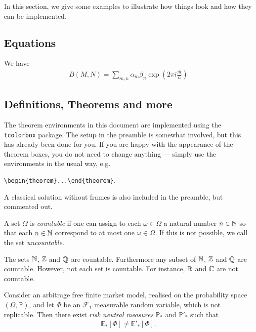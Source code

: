 In this section, we give some examples to illustrate how things look and how they can be implemented.

\subsection{Equations}
We have
\begin{align}
	B(M,N)
	=
	\sum_{m,n}\alpha_m\beta_n \exp\left(2\pi i \frac{\overline{m}}{n}\right)   
\end{align}

\subsection{Definitions, Theorems and more}
\label{sec:definitions-and-theorems}
%
The theorem environments in this document are implemented using the \verb|tcolorbox| package.
The setup in the preamble is somewhat involved, but this has already been done for you.
If you are happy with the appearance of the theorem boxes, you do not need to change anything — simply use the environments in the usual way, e.g.\ 
\begin{center}
\verb|\begin{theorem}...\end{theorem}|.
\end{center}
A classical solution without frames is also included in the preamble, but commented out.


\begin{definition}
	\label{def:countable set}
	A set $\Omega$ is \emph{countable} if one can assign to each $\omega\in\Omega$ a natural number $n\in\mathbb{N}$ so that each $n\in\mathbb{N}$ correspond to at most one $\omega\in\Omega$. 
	If this is not possible, we call the set \emph{uncountable}\index{uncountable}.
\end{definition}
%


\begin{example}
	\label{bsp:elementary_examples}
	The sets $\mathbb{N}$, $\mathbb{Z}$ and $\mathbb{Q}$ are countable.
	Furthermore any subset of  $\mathbb{N}$, $\mathbb{Z}$ and $\mathbb{Q}$ are countable.
	However, not each set is countable. For instance, $\mathbb{R}$ and $\mathbb{C}$ are not countable.
\end{example}


\begin{lemma}
	\label{lem:not_rep_measure}
	Consider an arbitrage free finite market model, realised on the probability space $(\Omega, \mathbb{P})$, and 
	let $\Phi$ be an $\mathcal{F}_T$ measurable random variable, which is not replicable.
	Then there exist \emph{risk neutral measures} $\mathbb{P}_*$ and $\mathbb{P}'_*$ such that
	\begin{align}
		\mathbb{E}_*[\Phi]\neq \mathbb{E}'_*[\Phi].
	\end{align} 
\end{lemma}


